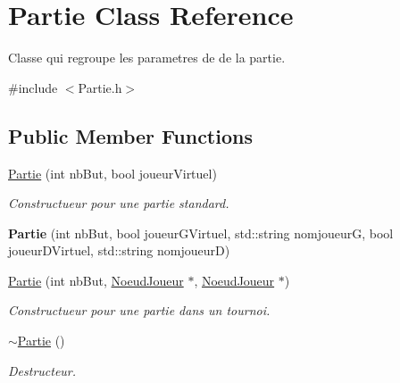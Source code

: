 \hypertarget{class_partie}{}\section{Partie Class Reference}
\label{class_partie}


Classe qui regroupe les parametres de de la partie.  




{\ttfamily \#include $<$Partie.\+h$>$}

\subsection*{Public Member Functions}
\begin{DoxyCompactItemize}
\item 
\hypertarget{class_partie_ae0fd466396b1f1da7f24106ea1336b7c}{}\label{class_partie_ae0fd466396b1f1da7f24106ea1336b7c} 
\hyperlink{class_partie_ae0fd466396b1f1da7f24106ea1336b7c}{Partie} (int nb\+But, bool joueur\+Virtuel)
\begin{DoxyCompactList}\small\item\em Constructueur pour une partie standard. \end{DoxyCompactList}\item 
\hypertarget{class_partie_a2eca467169d1e2cd9b0d6f77560ad68b}{}\label{class_partie_a2eca467169d1e2cd9b0d6f77560ad68b} 
{\bfseries Partie} (int nb\+But, bool joueur\+G\+Virtuel, std\+::string nomjoueurG, bool joueur\+D\+Virtuel, std\+::string nomjoueurD)
\item 
\hypertarget{class_partie_a60f6de457bc2b70555f26964174303a7}{}\label{class_partie_a60f6de457bc2b70555f26964174303a7} 
\hyperlink{class_partie_a60f6de457bc2b70555f26964174303a7}{Partie} (int nb\+But, \hyperlink{class_noeud_joueur}{Noeud\+Joueur} $\ast$, \hyperlink{class_noeud_joueur}{Noeud\+Joueur} $\ast$)
\begin{DoxyCompactList}\small\item\em Constructueur pour une partie dans un tournoi. \end{DoxyCompactList}\item 
\hypertarget{class_partie_ae4afeb7336bb84427272cfb7018b5e3d}{}\label{class_partie_ae4afeb7336bb84427272cfb7018b5e3d} 
\hyperlink{class_partie_ae4afeb7336bb84427272cfb7018b5e3d}{$\sim$\+Partie} ()
\begin{DoxyCompactList}\small\item\em Destructeur. \end{DoxyCompactList}\item 

\end{DoxyCompactItemize}
